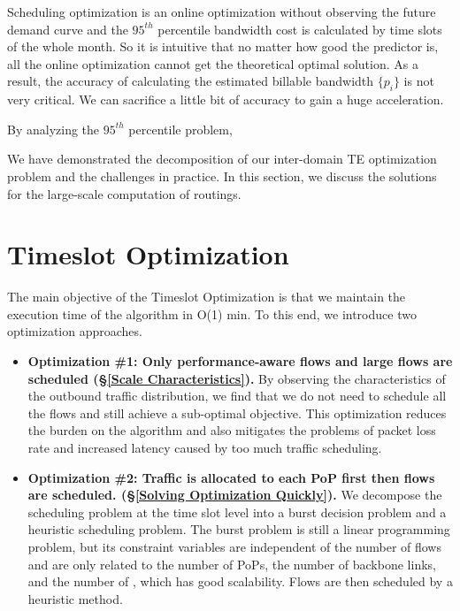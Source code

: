  Scheduling optimization is an online optimization without observing the future demand curve and the $95^{th}$ percentile bandwidth cost is calculated by time slots of the whole month. So it is intuitive that no matter how good the predictor is, all the online optimization cannot get the theoretical optimal solution. As a result, the accuracy of calculating the estimated billable bandwidth $\{p_i\}$ is not very critical. We can sacrifice a little bit of accuracy to gain a huge acceleration. 

 By analyzing the $95^{th}$ percentile problem, 




We have demonstrated the decomposition of our inter-domain TE optimization problem and the challenges in practice. In this section, we discuss the solutions for the large-scale computation of routings.


\section{Timeslot Optimization}\label{sec:timeslot-slu}
The main objective of the Timeslot Optimization is that we maintain the execution time of the algorithm in O(1) min. To this end, we introduce two optimization approaches. 

\begin{itemize}[leftmargin=*]  
\item \textbf{Optimization \#1: Only performance-aware flows and large flows are scheduled (\S\ref{Scale Characteristics}).} By observing the characteristics of the outbound traffic distribution, we find that we do not need to schedule all the flows and still achieve a sub-optimal objective. This optimization reduces the burden on the algorithm and also mitigates the problems of packet loss rate and increased latency caused by too much traffic scheduling. 
\item \textbf{Optimization \#2: Traffic is allocated to each PoP first then flows are scheduled. (\S\ref{Solving Optimization Quickly}).} We decompose the scheduling problem at the time slot level into a burst decision problem and a heuristic scheduling problem. The burst problem is still a linear programming problem, but its constraint variables are independent of the number of flows and are only related to the number of PoPs, the number of backbone links, and the number of {\egresses}, which has good scalability. Flows are then scheduled by a heuristic method.
\end{itemize}

